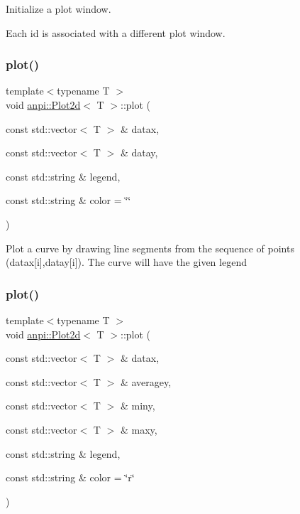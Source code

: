 Initialize a plot window.

Each id is associated with a different plot window. \mbox{\label{classanpi_1_1Plot2d_a0b04dd4c40f9f623789fa688bd3c593d}} 
\subsubsection{\texorpdfstring{plot()}{plot()}\hspace{0.1cm}{\footnotesize\ttfamily [1/2]}}
{\footnotesize\ttfamily template$<$typename T $>$ \\
void \hyperlink{classanpi_1_1Plot2d}{anpi\+::\+Plot2d}$<$ T $>$\+::plot (\begin{DoxyParamCaption}\item[{const std\+::vector$<$ T $>$ \&}]{datax,  }\item[{const std\+::vector$<$ T $>$ \&}]{datay,  }\item[{const std\+::string \&}]{legend,  }\item[{const std\+::string \&}]{color = {\ttfamily \char`\"{}\char`\"{}} }\end{DoxyParamCaption})}

Plot a curve by drawing line segments from the sequence of points (datax\mbox{[}i\mbox{]},datay\mbox{[}i\mbox{]}). The curve will have the given legend \mbox{\label{classanpi_1_1Plot2d_ad7978a6d763c92036ca249982a041dd1}} 
\subsubsection{\texorpdfstring{plot()}{plot()}\hspace{0.1cm}{\footnotesize\ttfamily [2/2]}}
{\footnotesize\ttfamily template$<$typename T $>$ \\
void \hyperlink{classanpi_1_1Plot2d}{anpi\+::\+Plot2d}$<$ T $>$\+::plot (\begin{DoxyParamCaption}\item[{const std\+::vector$<$ T $>$ \&}]{datax,  }\item[{const std\+::vector$<$ T $>$ \&}]{averagey,  }\item[{const std\+::vector$<$ T $>$ \&}]{miny,  }\item[{const std\+::vector$<$ T $>$ \&}]{maxy,  }\item[{const std\+::string \&}]{legend,  }\item[{const std\+::string \&}]{color = {\ttfamily \char`\"{}r\char`\"{}} }\end{DoxyParamCaption})}

